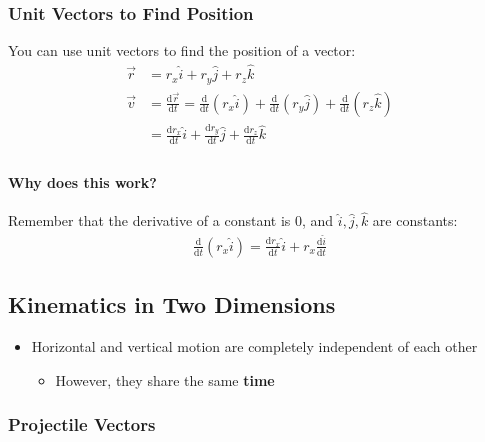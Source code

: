 \documentclass[
  letterpaper,
  DIV=11,
  numbers=noendperiod]{scrartcl}
\let\oldparagraph\paragraph
\renewcommand{\paragraph}[1]{\oldparagraph{#1}\mbox{}}
\providecommand{\tightlist}{%
  \setlength{\itemsep}{0pt}\setlength{\parskip}{0pt}}\usepackage{longtable,booktabs,array}
\begin{document}
\hypertarget{unit-vectors-to-find-position}{%
\subsubsection{Unit Vectors to Find
Position}\label{unit-vectors-to-find-position}}

You can use unit vectors to find the position of a vector:
\begin{align*}
\vec{r} &= r_x\hat{i} + r_y\hat{j} + r_z\hat{k} \\
\vec{v} &= \frac{\mathrm{d}\vec{r}}{\mathrm{d}{t}} = \frac{\mathrm{d}}{\mathrm{d}{t}}(r_x\hat{i}) + \frac{\mathrm{d}}{\mathrm{d}{t}}(r_y\hat{j}) + \frac{\mathrm{d}}{\mathrm{d}{t}}(r_z\hat{k}) \\
&= \frac{\mathrm{d}r_x}{\mathrm{d}t}\hat{i} + \frac{\mathrm{d}r_y}{\mathrm{d}t}\hat{j} + \frac{\mathrm{d}r_z}{\mathrm{d}t}\hat{k} \\
\end{align*}

\hypertarget{why-does-this-work}{%
\paragraph{Why does this work?}\label{why-does-this-work}}

Remember that the derivative of a constant is 0, and
\(\hat{i}, \hat{j}, \hat{k}\) are constants: \begin{align*}
\frac{\mathrm{d}}{\mathrm{d}t}(r_x\hat{i}) = \frac{\mathrm{d}r_x}{\mathrm{d}t}\hat{i} + r_x\frac{\mathrm{d}\hat{i}}{\mathrm{d}t}
\end{align*}

\hypertarget{kinematics-in-two-dimensions}{%
\subsection{Kinematics in Two
Dimensions}\label{kinematics-in-two-dimensions}}

\begin{itemize}
\tightlist
\item
  Horizontal and vertical motion are completely independent of each
  other

  \begin{itemize}
  \tightlist
  \item
    However, they share the same \textbf{time}
  \end{itemize}
\end{itemize}

\hypertarget{projectile-vectors}{%
\subsubsection{Projectile Vectors}\label{projectile-vectors}}
\end{document}
